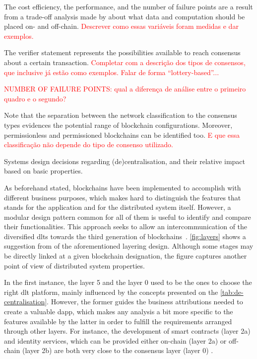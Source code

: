 The cost efficiency, the performance, and the number of failure points are a result from a trade-off analysis made by  about what data and computation should be placed on- and off-chain.
\textcolor{red}{Descrever como essas variáveis foram medidas e dar exemplos.}

The verifier statement represents the possibilities available to reach consensus about a certain transaction.
\textcolor{red}{Completar com a descrição dos tipos de consensos, que inclusive já estão como exemplos. Falar de forma ``lottery-based''...}

\textcolor{red}{NUMBER OF FAILURE POINTS: qual a diferença de análise entre o primeiro quadro e o segundo?}

Note that the separation between the network classification to the consensus types evidences the potential range of blockchain configurations.
Moreover, permissionless and permissioned blockchains can be identified too.
\textcolor{red}{E que essa classificação não depende do tipo de consenso utilizado.}

\begin{table}[h!tbp]{\textwidth}
    \centering
    \caption{Systems design decisions regarding (de)centralisation, and their relative impact based on basic properties.}
    \label{tab:de-centralisation}
    \frame{}
\end{table}

As beforehand stated,
blockchains have been implemented to accomplish with different business purposes,
which makes hard to distinguish the features that stands for the application and for the distributed system itself.
However, a modular design pattern common for all of them is useful to identify and compare their functionalities.
This approach seeks to allow an intercommunication of the diversified \glspl{dlt} towards the third generation of blockchains~\cite{vitalik2014}.
\autoref{fig:layers} shows a suggestion from  of the aforementioned layering design.
Although some stages may be directly linked at a given blockchain designation,
the figure captures another point of view of distributed system properties.

In the first instance, the layer 5 and the layer 0 used to be the ones to choose the right \gls{dlt} platform, mainly influenced by the concepts presented on the \autoref{tab:de-centralisation}.
However, the former guides the business attributions needed to create a valuable \gls{dapp},
which makes any analysis a bit more specific to the features available by the latter in order to fulfill the requirements arranged through other layers.
For instance, the development of smart contracts (layer 2a) and identity services, which can be provided either on-chain (layer 2a) or off-chain (layer 2b) are both very close to the consensus layer (layer 0) \cite{hyper2}.


